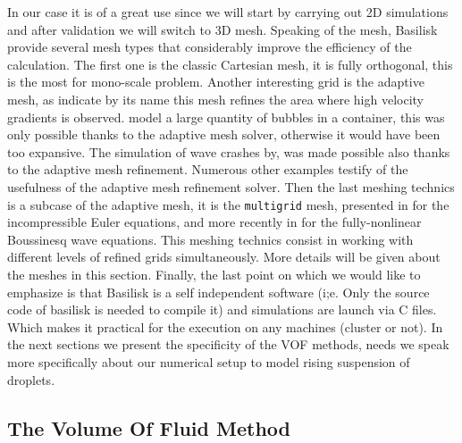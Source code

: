 In our case it is of a great use since we will start by carrying out 2D simulations and after validation we will switch to 3D mesh.
Speaking of the mesh, Basilisk provide several mesh types that considerably improve the efficiency of the calculation.
The first one is the classic Cartesian mesh, it is fully orthogonal, this is the most for mono-scale problem.
Another interesting grid is the adaptive mesh, as indicate by its name this mesh refines the area where high velocity gradients is observed.
\citet{innocenti2020direct} model a large quantity of bubbles in a container, this was only possible thanks to the adaptive mesh solver, otherwise it would have been too expansive.
The simulation of wave crashes by, \citet{mostert2022high} was made possible also thanks to the adaptive mesh refinement.
Numerous other examples testify of the usefulness of the adaptive mesh refinement solver.   
Then the last meshing technics is a subcase of the adaptive mesh, it is the \texttt{multigrid} mesh, presented in \citet{popinet2003gerris} for the incompressible Euler equations, and more recently in \citet{popinet2015quadtree} for the fully-nonlinear Boussinesq wave equations. 
This meshing technics consist in working with different levels of refined grids simultaneously.
More details will be given about the meshes in this section. 
Finally, the last point on which we would like to emphasize is that Basilisk is a self independent software (i;e. Only the source code of basilisk is needed to compile it) and simulations are launch via C files. 
Which makes it practical for the execution on any machines (cluster or not). 
In the next sections we present the specificity of the VOF methods, needs we speak more specifically about our numerical setup to model rising suspension of droplets. 



\subsection{The Volume Of Fluid Method}

